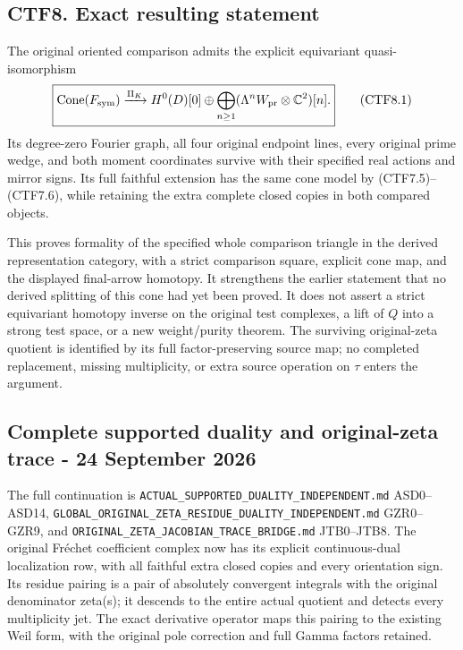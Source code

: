 \subsection{CTF8. Exact resulting
statement}\label{ctf8.-exact-resulting-statement}

The original oriented comparison admits the explicit equivariant
quasi-isomorphism \[
\boxed{\operatorname{Cone}(F_{\rm sym})
\xrightarrow{\Pi_K}
H^0(D)[0]\oplus\bigoplus_{n\ge1}
(\Lambda^nW_{\rm pr}\otimes\mathbb C^2)[n].}
\tag{CTF8.1}
\] Its degree-zero Fourier graph, all four original endpoint lines,
every original prime wedge, and both moment coordinates survive with
their specified real actions and mirror signs. Its full faithful
extension has the same cone model by (CTF7.5)--(CTF7.6), while retaining
the extra complete closed copies in both compared objects.

This proves formality of the specified whole comparison triangle in the
derived representation category, with a strict comparison square,
explicit cone map, and the displayed final-arrow homotopy. It
strengthens the earlier statement that no derived splitting of this cone
had yet been proved. It does not assert a strict equivariant homotopy
inverse on the original test complexes, a lift of \(Q\) into a strong
test space, or a new weight/purity theorem. The surviving original-zeta
quotient is identified by its full factor-preserving source map; no
completed replacement, missing multiplicity, or extra source operation
on \(\tau\) enters the argument.

\subsection{Complete supported duality and original-zeta trace - 24
September
2026}\label{complete-supported-duality-and-original-zeta-trace---24-september-2026}

The full continuation is \nolinkurl{ACTUAL_SUPPORTED_DUALITY_INDEPENDENT.md}
ASD0--ASD14, \nolinkurl{GLOBAL_ORIGINAL_ZETA_RESIDUE_DUALITY_INDEPENDENT.md}
GZR0--GZR9, and \nolinkurl{ORIGINAL_ZETA_JACOBIAN_TRACE_BRIDGE.md} JTB0--JTB8.
The original Fréchet coefficient complex now has its explicit
continuous-dual localization row, with all faithful extra closed copies
and every orientation sign. Its residue pairing is a pair of absolutely
convergent integrals with the original denominator zeta(s); it descends
to the entire actual quotient and detects every multiplicity jet. The
exact derivative operator maps this pairing to the existing Weil form,
with the original pole correction and full Gamma factors retained.

